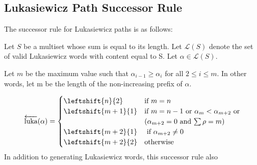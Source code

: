 \subsection{Lukasiewicz Path Successor Rule}
The successor rule for Lukasiewicz paths is as follows:

Let $S$ be a multiset whose sum is equal to its length.  Let $\mathcal{L}(S)$ denote the set of valid Lukasiewicz words with content equal to S. Let $\alpha \in \mathcal{L}(S)$.  

Let $m$ be the maximum value such that $\alpha_{i-1} \ge \alpha_{i}$ for all $2 \le i \le m$. In other words, let m be the length of the non-increasing prefix of $\alpha$.


\begin{equation*}
    \overleftarrow{\text{luka}}(\alpha) = \begin{cases}
	\leftshift{n}{2} & $if $ m=n \\
	\leftshift{m+1}{1} & $if $ m=n-1 $ or $ \alpha_{m} < \alpha_{m+2}  $ or$ \\
    & (\alpha_{m+2} = 0 $ and $ \sum \rho = m) \\
	\leftshift{m+2}{1} & $ if $ \alpha_{m+2} \neq 0 \\
	\leftshift{m+2}{2} & $otherwise$  \\
\end{cases}
\end{equation*}
In addition to generating Lukasiewicz words, this successor rule also 
